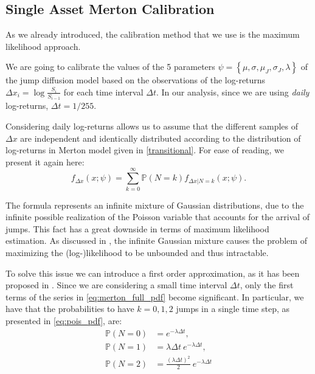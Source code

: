 \subsection{Single Asset Merton Calibration}
As we already introduced, the calibration method that we use is the maximum likelihood approach.

We are going to calibrate the values of the 5 parameters $\psi= \left\{ \mu, \sigma, \mu_J, \sigma_J, \lambda \right\}$ of the jump diffusion model based on the observations of the log-returns $\Delta x_i = \log \frac{S_i}{S_{i-1}}$ for each time interval $\Delta t$. In our analysis, since we are using \textit{daily} log-returns, $\Delta t = 1/255$. 

Considering daily log-returns allows us to assume that the different samples of $\Delta x$ are independent and identically distributed according to the distribution of log-returns in Merton model given in \eqref{transitional}.
For ease of reading, we present it again here:
\begin{equation}
\label{eq:merton_full_pdf}
f_{\Delta x } (x; \psi) = \sum_{k=0}^{\infty} \mathbb{P}(N = k) f_{\Delta x | N = k}(x ; \psi) .
\end{equation}

The formula represents an infinite mixture of Gaussian distributions, due to the infinite possible realization of the Poisson variable that accounts for the arrival of jumps. 
This fact has a great downside in terms of maximum likelihood estimation. As discussed in \citep{HONORE1998}, the infinite Gaussian mixture causes the problem of maximizing the (log-)likelihood to be unbounded and thus intractable.

To solve this issue we can introduce a first order approximation, as it has been proposed in \citep{BALLTOROUS1983}. 
Since we are considering a small time interval $\Delta t $, only the first terms of the series in \eqref{eq:merton_full_pdf} become significant. 
In particular, we have that the probabilities to have $k = 0, 1, 2$ jumps in a single time step, as presented in \eqref{eq:pois_pdf}, are:
\begin{subequations}
	\begin{align}
	\mathbb{P}(N = 0) &= e^{-\lambda \Delta t}, \\
	\mathbb{P}(N = 1) &= \lambda \Delta t \: e^{-\lambda \Delta t}, \\
	\mathbb{P}(N = 2) &= \frac{(\lambda \Delta t)^2}{2} \: e^{-\lambda \Delta t}
	\end{align}
\end{subequations}


